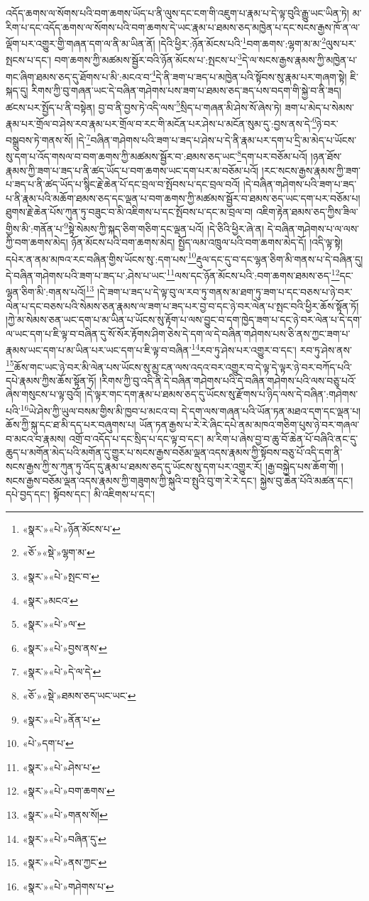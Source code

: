 འདོད་ཆགས་ལ་སོགས་པའི་བག་ཆགས་ཡོད་པ་ནི་ལུས་དང་ངག་གི་འཇུག་པ་རྣམ་པ་དེ་ལྟ་བུའི་རྒྱུ་ཡང་ཡིན་ཏེ། མ་རིག་པ་དང་འདོད་ཆགས་ལ་སོགས་པའི་བག་ཆགས་དེ་ཡང་རྣམ་པ་ཐམས་ཅད་མཁྱེན་པ་དང་སངས་རྒྱས་ཁོ་ན་ལ་ལྡོག་པར་འགྱུར་གྱི་གཞན་དག་ལ་ནི་མ་ཡིན་ནོ། །དེའི་ཕྱིར་:ཉོན་མོངས་པའི་\footnote{«སྣར་»«པེ་»ཉོན་མོངས་པ་}བག་ཆགས་:ལྷག་མ་མ་\footnote{«ཅོ་»«སྡེ་»ལྷག་མ་}ལུས་པར་སྤངས་པ་དང་། བག་ཆགས་ཀྱི་མཚམས་སྦྱོར་བའི་ཉོན་མོངས་པ་:སྤངས་པ་\footnote{«སྣར་»«པེ་»སྤང་བ་}དེ་ལ་སངས་རྒྱས་རྣམས་ཀྱི་མཁྱེན་པ་གང་ཞིག་ཐམས་ཅད་དུ་ཐོགས་པ་མི་:མངའ་བ་\footnote{«སྣར་»མངའ་}དེ་ནི་ཟག་པ་ཟད་པ་མཁྱེན་པའི་སྟོབས་སུ་རྣམ་པར་གཞག་སྟེ། ཇི་སྐད་དུ། རིགས་ཀྱི་བུ་གཞན་ཡང་དེ་བཞིན་གཤེགས་པས་ཟག་པ་ཐམས་ཅད་ཟད་པས་བདག་གི་སྐྱེ་བ་ནི་ཟད། ཚངས་པར་སྤྱོད་པ་ནི་བསྟེན། བྱ་བ་ནི་བྱས་ཏེ་འདི་ལས་\footnote{«སྣར་»«པེ་»ལ་}སྲིད་པ་གཞན་མི་ཤེས་སོ་ཞེས་ཏེ། ཟག་པ་མེད་པ་སེམས་རྣམ་པར་གྲོལ་བ་ཤེས་རབ་རྣམ་པར་གྲོལ་བ་རང་གི་མངོན་པར་ཤེས་པ་མངོན་སུམ་དུ་:བྱས་ནས་དེ་\footnote{«སྣར་»«པེ་»བྱས་ནས་}ཉེ་བར་བསྒྲུབས་ཏེ་གནས་སོ། །དེ་\footnote{«སྣར་»«པེ་»དེ་ལ་དེ་}བཞིན་གཤེགས་པའི་ཟག་པ་ཟད་པ་ཤེས་པ་དེ་ནི་རྣམ་པར་དག་པ་དྲི་མ་མེད་པ་ཡོངས་སུ་དག་པ་འོད་གསལ་བ་བག་ཆགས་ཀྱི་མཚམས་སྦྱོར་བ་:ཐམས་ཅད་ཡང་\footnote{«ཅོ་»«སྡེ་»ཐམས་ཅད་ཡང་ཡང་}དག་པར་བཅོམ་པའོ། །ཉན་ཐོས་རྣམས་ཀྱི་ཟག་པ་ཟད་པ་ནི་ཚད་ཡོད་པ་བག་ཆགས་ཡང་དག་པར་མ་བཅོམ་པའོ། །རང་སངས་རྒྱས་རྣམས་ཀྱི་ཟག་པ་ཟད་པ་ནི་ཚད་ཡོད་པ་སྙིང་རྗེ་ཆེན་པོ་དང་བྲལ་བ་སྤོབས་པ་དང་བྲལ་བའོ། །དེ་བཞིན་གཤེགས་པའི་ཟག་པ་ཟད་པ་ནི་རྣམ་པའི་མཆོག་ཐམས་ཅད་དང་ལྡན་པ་བག་ཆགས་ཀྱི་མཚམས་སྦྱོར་བ་ཐམས་ཅད་ཡང་དག་པར་བཅོམ་པ། ཐུགས་རྗེ་ཆེན་པོས་ཀུན་ཏུ་བཟུང་བ་མི་འཇིགས་པ་དང་སྤོབས་པ་དང་མ་བྲལ་བ། འཇིག་རྟེན་ཐམས་ཅད་ཀྱིས་ཟིལ་གྱིས་མི་:གནོན་པ་\footnote{«སྣར་»«པེ་»ནོན་པ་}སྟེ་སེམས་ཀྱི་སྐད་ཅིག་གཅིག་དང་ལྡན་པའོ། །དེ་ཅིའི་ཕྱིར་ཞེ་ན། དེ་བཞིན་གཤེགས་པ་ལ་ལས་ཀྱི་བག་ཆགས་མེད། ཉོན་མོངས་པའི་བག་ཆགས་མེད། སྤྱོད་ལམ་འཁྲུལ་པའི་བག་ཆགས་མེད་དོ། །འདི་ལྟ་སྟེ། དཔེར་ན་ནམ་མཁའ་རང་བཞིན་གྱིས་ཡོངས་སུ་:དག་པས་\footnote{«པེ་»དག་པ་}རྡུལ་དང་དུ་བ་དང་ལྷན་ཅིག་མི་གནས་པ་དེ་བཞིན་དུ། དེ་བཞིན་གཤེགས་པའི་ཟག་པ་ཟད་པ་:ཤེས་པ་ཡང་\footnote{«སྣར་»«པེ་»ཤེས་པ་}ལས་དང་ཉོན་མོངས་པའི་:བག་ཆགས་ཐམས་ཅད་\footnote{«སྣར་»«པེ་»བག་ཆགས་}དང་ལྷན་ཅིག་མི་:གནས་པའོ།\footnote{«སྣར་»«པེ་»གནས་སོ།} །དེ་ཟག་པ་ཟད་པ་དེ་ལྟ་བུ་ལ་རབ་ཏུ་གནས་མ་ཐག་ཏུ་ཟག་པ་དང་བཅས་པ་ཉེ་བར་ལེན་པ་དང་བཅས་པའི་སེམས་ཅན་རྣམས་ལ་ཟག་པ་ཟད་པར་བྱ་བ་དང་ཉེ་བར་ལེན་པ་སྤང་བའི་ཕྱིར་ཆོས་སྟོན་ཏོ། །ཀྱེ་མ་སེམས་ཅན་ཡང་དག་པ་མ་ཡིན་པ་ཡོངས་སུ་རྟོག་པ་ལས་བྱུང་བ་དག་ཁྱེད་ཟག་པ་དང་ཉེ་བར་ལེན་པ་དེ་དག་ལ་ཡང་དག་པ་ཇི་ལྟ་བ་བཞིན་དུ་སོ་སོར་རྟོགས་ཤིག་ཅེས་དེ་དག་ལ་དེ་བཞིན་གཤེགས་པས་ཅི་ནས་ཀྱང་ཟག་པ་རྣམས་ཡང་དག་པ་མ་ཡིན་པར་ཡང་དག་པ་ཇི་ལྟ་བ་བཞིན་\footnote{«སྣར་»«པེ་»བཞིན་དུ་}རབ་ཏུ་ཤེས་པར་འགྱུར་བ་དང་། རབ་ཏུ་ཤེས་ནས་\footnote{«སྣར་»«པེ་»ནས་ཀྱང་}ཆོས་གང་ཡང་ཉེ་བར་མི་ལེན་པས་ཡོངས་སུ་མྱ་ངན་ལས་འདའ་བར་འགྱུར་བ་དེ་ལྟ་དེ་ལྟར་ཉེ་བར་བཀོད་པའི་དཔེ་རྣམས་ཀྱིས་ཆོས་སྟོན་ཏོ། །རིགས་ཀྱི་བུ་འདི་ནི་དེ་བཞིན་གཤེགས་པའི་དེ་བཞིན་གཤེགས་པའི་ལས་བཅུ་པའོ་ཞེས་གསུངས་པ་ལྟ་བུའོ། །དེ་ལྟར་གང་དག་རྣམ་པ་ཐམས་ཅད་དུ་ཡོངས་སུ་རྫོགས་པ་ཉིད་ལས་དེ་བཞིན་:གཤེགས་པའི་\footnote{«སྣར་»«པེ་»གཤེགས་པ་}ཡེ་ཤེས་ཀྱི་ཡུལ་བསམ་གྱིས་མི་ཁྱབ་པ་མངའ་བ། དེ་དག་ལས་གཞན་པའི་ཡོན་ཏན་མཐའ་དག་དང་ལྡན་པ། ཆོས་ཀྱི་སྐུ་དང་ཐ་མི་དད་པར་བཞུགས་པ། ཡོན་ཏན་རྒྱས་པ་རེ་རེ་ཞིང་དཔེ་ནམ་མཁའ་གཅིག་པུས་ཉེ་བར་གཞལ་བ་མངའ་བ་རྣམས། འགྲོ་བ་འདོད་པ་དང་སྲིད་པ་དང་ལྟ་བ་དང་། མ་རིག་པ་ཞེས་བྱ་བ་ཆུ་བོ་ཆེན་པོ་བཞིའི་ནང་དུ་ཆུད་པ་མགོན་མེད་པའི་མགོན་དུ་གྱུར་པ་སངས་རྒྱས་བཅོམ་ལྡན་འདས་རྣམས་ཀྱི་སྟོབས་བཅུ་པོ་འདི་དག་ནི་སངས་རྒྱས་ཀྱི་ས་ཀུན་ཏུ་འོད་དུ་རྣམ་པ་ཐམས་ཅད་དུ་ཡོངས་སུ་དག་པར་འགྱུར་རོ། །རྒྱ་བསྐྱེད་པས་ཆོག་གོ། །སངས་རྒྱས་བཅོམ་ལྡན་འདས་རྣམས་ཀྱི་གཟུགས་ཀྱི་སྐུའི་བ་སྤུའི་བུ་ག་རེ་རེ་དང་། སྐྱེས་བུ་ཆེན་པོའི་མཚན་དང་། དཔེ་བྱད་དང་། སྟོབས་དང་། མི་འཇིགས་པ་དང་། 